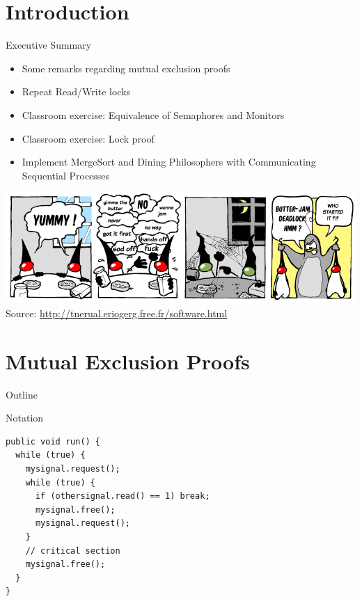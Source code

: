\section*{Introduction}

\begin{frame}{Executive Summary}
  \begin{itemize}
  \item Some remarks regarding mutual exclusion proofs
  \item Repeat Read/Write locks
  \item Classroom exercise: Equivalence of Semaphores and Monitors
  \item Classroom exercise: Lock proof
  \item Implement MergeSort and Dining Philosophers with Communicating
    Sequential Processes
  \end{itemize}

  \begin{center}
    \includegraphics[width=\textwidth]{figures/butter-jam-deadlock}\\
    \tiny{Source: \url{http://tnerual.eriogerg.free.fr/software.html}}
  \end{center}
\end{frame}


\section{Mutual Exclusion Proofs}

\begin{frame}{Outline}
  \tableofcontents[current]
\end{frame}

\begin{frame}[fragile]{Notation}
\begin{lstlisting}
public void run() {
  while (true) {
    mysignal.request();
    while (true) {
      if (othersignal.read() == 1) break;
      mysignal.free();
      mysignal.request();
    }
    // critical section
    mysignal.free();
  }
}
\end{lstlisting}
\end{frame}

